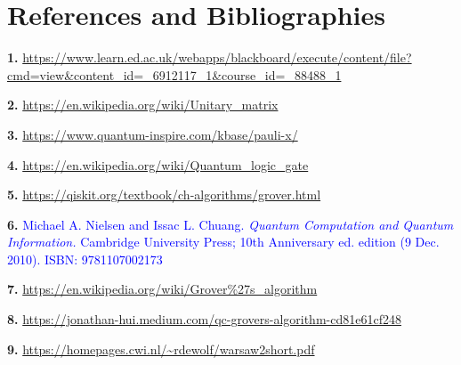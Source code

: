 \documentclass{article}
\begin{document}
\section{References and Bibliographies}
\vspace{5mm}

\textbf{1.} \hypertarget{1}{\url{https://www.learn.ed.ac.uk/webapps/blackboard/execute/content/file?cmd=view&content_id=_6912117_1&course_id=_88488_1}}
\vspace{5mm}

\noindent
\textbf{2.} \hypertarget{2}{\url{https://en.wikipedia.org/wiki/Unitary_matrix}}
\vspace{5mm}

\noindent
\textbf{3.} \hypertarget{3}{\url{https://www.quantum-inspire.com/kbase/pauli-x/}}
\vspace{5mm}

\noindent
\textbf{4.} \hypertarget{4}{\url{https://en.wikipedia.org/wiki/Quantum_logic_gate}}
\vspace{5mm}

\noindent
\textbf{5.} \hypertarget{5}{\url{https://qiskit.org/textbook/ch-algorithms/grover.html}}
\vspace{5mm}

\noindent
\textbf{6.} \hypertarget{6}{\textcolor{blue}{Michael A. Nielsen and Issac L. Chuang. \textit{Quantum Computation and Quantum Information.} Cambridge University Press; 10th Anniversary ed. edition (9 Dec. 2010). ISBN: 9781107002173 }}
\vspace{5mm}

\noindent
\textbf{7.} \hypertarget{7}{\url{https://en.wikipedia.org/wiki/Grover\%27s_algorithm}}
\vspace{5mm}

\noindent
\textbf{8.} \hypertarget{8}{\url{https://jonathan-hui.medium.com/qc-grovers-algorithm-cd81e61cf248}}
\vspace{5mm}

\noindent
\textbf{9.} \hyperlink{9}{\url{https://homepages.cwi.nl/~rdewolf/warsaw2short.pdf}}
\end{document}
